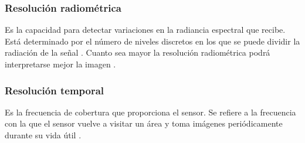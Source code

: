 	\subsubsection{Resolución radiométrica}
	Es la capacidad para detectar variaciones en la radiancia espectral que recibe. Está determinado por el número de niveles discretos en los que se puede dividir la radiación de la señal \parencite{camps2011remote}. Cuanto sea mayor la resolución radiométrica podrá interpretarse mejor la imagen \parencite{chuvieco1996fundamentos}.
	\subsubsection{Resolución temporal}
	Es la frecuencia de cobertura que proporciona el sensor. Se refiere a la frecuencia con la que el sensor vuelve a visitar un área y toma imágenes periódicamente durante su vida útil \parencite{meneses2012introduccao}.
	
